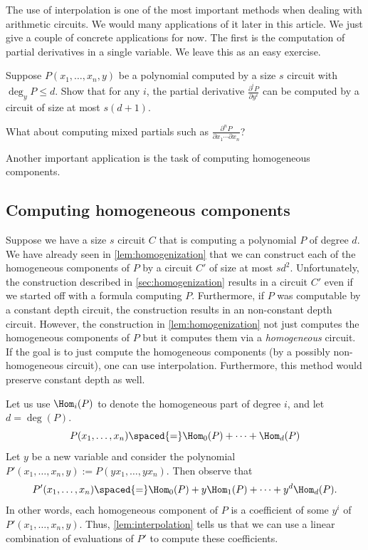 The use of interpolation is one of the most important methods when dealing with arithmetic circuits. We would many applications of it later in this article. We just give a couple of concrete applications for now. The first is the computation of partial derivatives in a single variable. We leave this as an easy exercise. 

\begin{exercise}
Suppose $P(x_1,\ldots, x_n,y)$ be a polynomial computed by a size $s$ circuit with $\deg_y P \leq d$. Show that for any $i$, the partial derivative
$\frac{\partial^i P}{\partial y^i}$ can be computed by a circuit of size at most $s(d+1)$. 

What about computing mixed partials such as $\frac{\partial^n P}{\partial x_1 \cdots \partial x_n}$?
\end{exercise}

\noindent 
Another important application is the task of computing homogeneous components. 

\subsection{Computing homogeneous components}

Suppose we have a size $s$ circuit $C$ that is computing a polynomial $P$ of degree $d$.
We have already seen in \autoref{lem:homogenization} that we can construct each of the homogeneous components of $P$ by a circuit $C'$ of size at most $sd^2$.
Unfortunately, the construction described in \autoref{sec:homogenization} results in a circuit $C'$ even if we started off with a formula computing $P$.
Furthermore, if $P$ was computable by a constant depth circuit, the construction results in an non-constant depth circuit.
However, the construction in \autoref{lem:homogenization} not just computes the homogeneous components of $P$ but it computes them via a \emph{homogeneous} circuit. If the goal is to just compute the homogeneous components (by a possibly non-homogeneous circuit), one can use interpolation. Furthermore, this method would preserve constant depth as well.

Let us use $\Hom_i(P)$ to denote the homogeneous part of degree $i$, and let $d = \deg(P)$.
\[
P(x_1,\ldots, x_n) \spaced{=} \Hom_0(P) + \cdots + \Hom_d(P)
\]
Let $y$ be a new variable and consider the polynomial $P'(x_1,\ldots, x_n, y) := P(yx_1, \ldots, y x_n)$. Then observe that
\[
P'(x_1,\ldots, x_n) \spaced{=} \Hom_0(P) + y\Hom_1(P) + \cdots + y^d \Hom_d(P).
\]
In other words, each homogeneous component of $P$ is a coefficient of some $y^i$ of $P'(x_1,\ldots, x_n,y)$. Thus, \autoref{lem:interpolation} tells us that we can use a linear combination of evaluations of $P'$ to compute these coefficients. 

